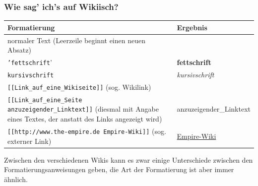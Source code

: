\documentclass{beamer}
\begin{document}
\begin{frame}
  \frametitle{Wie sag’ ich’s auf Wikiisch?}
  \begin{longtable}{|l|l|}
    \hline
    \textbf{Formatierung                                           } & \textbf{Ergebnis                      } \\ 
    \hline
     
    normaler Text (Leerzeile beginnt einen neuen Absatz)             &                                \\ 
    \hline
     
    \texttt{'fettschrift}'                                           & \textbf{fettschrift}                \\ 
    \hline
     
    \texttt{kursivschrift}                                           & \emph{kursivschrift}                \\ 
    \hline
     
    \texttt{[[Link\_auf\_eine\_Wikiseite]]} (sog. Wikilink)          &     \\ 
    \hline
     
    \texttt{[[Link\_auf\_eine\_Seite anzuzeigender\_Linktext]]} (diesmal mit Angabe eines Textes, der anstatt des Links angezeigt wird)                    &  anzuzeigender\_Linktext \\ 
    \hline
     
    \texttt{[[http://www.the-empire.de Empire-Wiki]]} (sog. externer Link)     & \href{http://www.the-empire.de}{ Empire-Wiki} \\ 
    \hline
     
  \end{longtable}

  Zwischen den verschiedenen Wikis kann es zwar einige Unterschiede zwischen den Formatierungsanweisungen geben, die Art der Formatierung ist aber immer ähnlich.
\end{frame}
\end{document}
